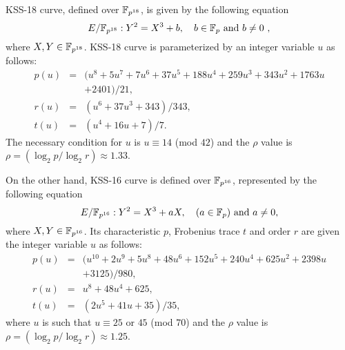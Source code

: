 KSS-18 curve, defined over $\mathbb{F}_{p^{18}}$, is given by the following equation
\begin{equation}\label{eq:KSS_curve_18_chap_ijnc2017_chap_ijnc2017}
E/\mathbb{F}_{p^{18}}:Y^2=X^3+b, \quad \mbox{$b \in {\mathbb{F}}_{p}$ and $b \neq 0$ },
\end{equation}
where  $X,Y \in \mathbb{F}_{p^{18}}$. KSS-18 curve is parameterized by an integer variable $u$ as follows:
\begin{subequations}
	\begin{eqnarray}
	p(u)  &= &(u^8 +5u^7 +7u^6 +37u^5 +188u^4 +259u^3 + 343u^2 +1763u \nonumber \\
	& &   +2401)/21,              \label{eq:kss_char_chap_ijnc2017} \\
	r(u) & =&  (u^6 + 37u^3 + 343)/343, \label{eq:kss_degree_chap_ijnc2017}  \\
	t(u) &=&  (u^4 + 16u + 7)/7. \label{eq:kss18_trace_chap_ijnc2017} 
	\end{eqnarray}
\end{subequations} 
The necessary condition for $u$ is $u \equiv 14$ (mod $42$) and the $\rho$ value is $\rho = (\log_2 p/\log_2 r) \approx 1.33$.

On the other hand, KSS-16 curve is defined over $\mathbb{F}_{p^{16}}$, represented by the following equation
\begin{equation}\label{eq:KSS_16_trace_chap_ijnc2017}
E/\mathbb{F}_{p^{16}}:Y^2=X^3+aX, \quad \mbox{($a \in {\mathbb{F}}_{p}$) and  $a \neq 0$},
\end{equation}
where $X,Y \in \mathbb{F}_{p^{16}}$. Its characteristic $p$, Frobenius trace $t$ and order $r$ are given the integer variable $u$ as follows:
\begin{subequations}
	\begin{eqnarray}
	p(u) &= & (u^{10} +2u^9 +5u^8 +48u^6 +152u^5 +240u^4 +625u^2 +2398u \nonumber \\
	&& +3125)/980,  \\\label{eq:kss_16_char_trace_chap_ijnc2017}
	r(u) &= & u^8 +48u^4 +625,\label{eq:kss_16_degree_chap_ijnc2017}  \\
	t(u) &=& (2u^5 +41u+35)/35, \label{eq:kss_16_trace_chap_ijnc2017} 
	\end{eqnarray}
\end{subequations} 
where $u$ is such that $u \equiv 25$ or $45$ (mod $70$) and the $\rho$ value is $\rho = (\log_2 p/\log_2 r) \approx 1.25$.

